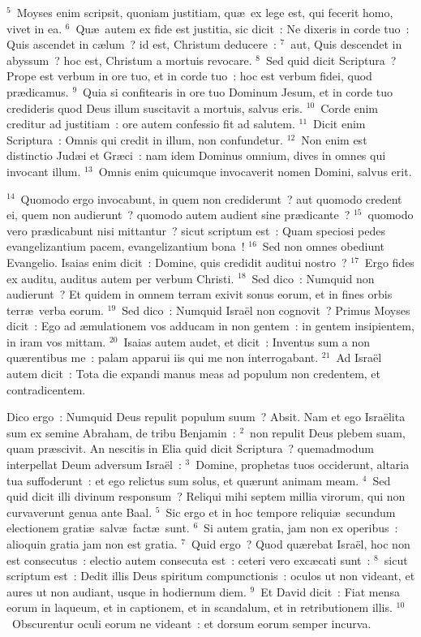 ${}^{5}$~Moyses enim scripsit, quoniam justitiam, qu\ae\ ex lege est, qui fecerit homo, vivet in ea.
${}^{6}$~Qu\ae\ autem ex fide est justitia, sic dicit~: Ne dixeris in corde tuo~: Quis ascendet in c\ae lum~? id est, Christum deducere~:
${}^{7}$~aut, Quis descendet in abyssum~? hoc est, Christum a mortuis revocare.
${}^{8}$~Sed quid dicit Scriptura~? Prope est verbum in ore tuo, et in corde tuo~: hoc est verbum fidei, quod pr\ae dicamus.
${}^{9}$~Quia si confitearis in ore tuo Dominum Jesum, et in corde tuo credideris quod Deus illum suscitavit a mortuis, salvus eris.
${}^{10}$~Corde enim creditur ad justitiam~: ore autem confessio fit ad salutem.
${}^{11}$~Dicit enim Scriptura~: Omnis qui credit in illum, non confundetur.
${}^{12}$~Non enim est distinctio Jud\ae i et Gr\ae ci~: nam idem Dominus omnium, dives in omnes qui invocant illum.
${}^{13}$~Omnis enim quicumque invocaverit nomen Domini, salvus erit.


${}^{14}$~Quomodo ergo invocabunt, in quem non crediderunt~? aut quomodo credent ei, quem non audierunt~? quomodo autem audient sine pr\ae dicante~?
${}^{15}$~quomodo vero pr\ae dicabunt nisi mittantur~? sicut scriptum est~: Quam speciosi pedes evangelizantium pacem, evangelizantium bona~!
${}^{16}$~Sed non omnes obediunt Evangelio. Isaias enim dicit~: Domine, quis credidit auditui nostro~?
${}^{17}$~Ergo fides ex auditu, auditus autem per verbum Christi.
${}^{18}$~Sed dico~: Numquid non audierunt~? Et quidem in omnem terram exivit sonus eorum, et in fines orbis terr\ae\ verba eorum.
${}^{19}$~Sed dico~: Numquid Isra\"el non cognovit~? Primus Moyses dicit~: Ego ad \ae mulationem vos adducam in non gentem~: in gentem insipientem, in iram vos mittam.
${}^{20}$~Isaias autem audet, et dicit~: Inventus sum a non qu\ae rentibus me~: palam apparui iis qui me non interrogabant.
${}^{21}$~Ad Isra\"el autem dicit~: Tota die expandi manus meas ad populum non credentem, et contradicentem.

\lettrine[lines=10,image=true,loversize=0.05,lraise=-0.03]{D}{}ico ergo~: Numquid Deus repulit populum suum~? Absit. Nam et ego Isra\"elita sum ex semine Abraham, de tribu Benjamin~:
${}^{2}$~non repulit Deus plebem suam, quam pr\ae scivit. An nescitis in Elia quid dicit Scriptura~? quemadmodum interpellat Deum adversum Isra\"el~:
${}^{3}$~Domine, prophetas tuos occiderunt, altaria tua suffoderunt~: et ego relictus sum solus, et qu\ae runt animam meam.
${}^{4}$~Sed quid dicit illi divinum responsum~? Reliqui mihi septem millia virorum, qui non curvaverunt genua ante Baal.
${}^{5}$~Sic ergo et in hoc tempore reliqui\ae\ secundum electionem grati\ae\ salv\ae\ fact\ae\ sunt.
${}^{6}$~Si autem gratia, jam non ex operibus~: alioquin gratia jam non est gratia.
${}^{7}$~Quid ergo~? Quod qu\ae rebat Isra\"el, hoc non est consecutus~: electio autem consecuta est~: ceteri vero exc\ae cati sunt~:
${}^{8}$~sicut scriptum est~: Dedit illis Deus spiritum compunctionis~: oculos ut non videant, et aures ut non audiant, usque in hodiernum diem.
${}^{9}$~Et David dicit~: Fiat mensa eorum in laqueum, et in captionem, et in scandalum, et in retributionem illis.
${}^{10}$~Obscurentur oculi eorum ne videant~: et dorsum eorum semper incurva.



